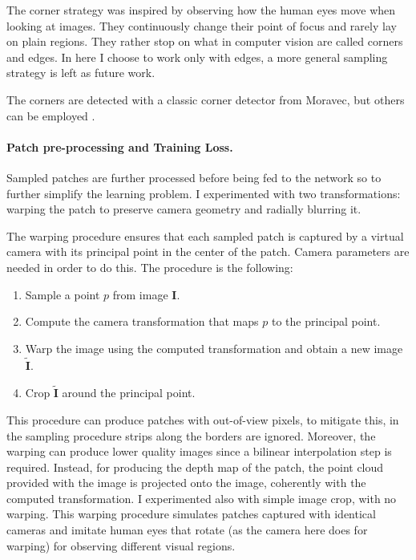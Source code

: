 The corner strategy was inspired by observing how the human eyes move when looking at images.
They continuously change their point of focus and rarely lay on plain regions.
They rather stop on what in computer vision are called corners and edges.
In here I choose to work only with edges, a more general sampling strategy is left as future work.

The corners are detected with a classic corner detector from Moravec, but others can be employed \cite{computer_vision}.

\paragraph{Patch pre-processing and Training Loss.}
Sampled patches are further processed before being fed to the network so to further simplify the learning problem.
I experimented with two transformations: warping the patch to preserve camera geometry and radially blurring it.

The warping procedure ensures that each sampled patch is captured by a virtual camera with its principal point in the center of the patch.
Camera parameters are needed in order to do this.
The procedure is the following:
\begin{enumerate}
    \item{Sample a point $p$ from image $\mathbf{I}$.}
    \item{Compute the camera transformation that maps $p$ to the principal point.}
    \item{Warp the image using the computed transformation and obtain a new image $\tilde{\mathbf{I}}$.}
    \item{Crop $\tilde{\mathbf{I}}$ around the principal point.}
\end{enumerate}
This procedure can produce patches with out-of-view pixels, to mitigate this, in the sampling procedure strips along the borders are ignored.
Moreover, the warping can produce lower quality images since a bilinear interpolation step is required.
Instead, for producing the depth map of the patch, the point cloud provided with the image is projected onto the image, coherently with the computed transformation.
I experimented also with simple image crop, with no warping.
This warping procedure simulates patches captured with identical cameras and imitate human eyes that rotate (as the camera here does for warping) for observing different visual regions.

